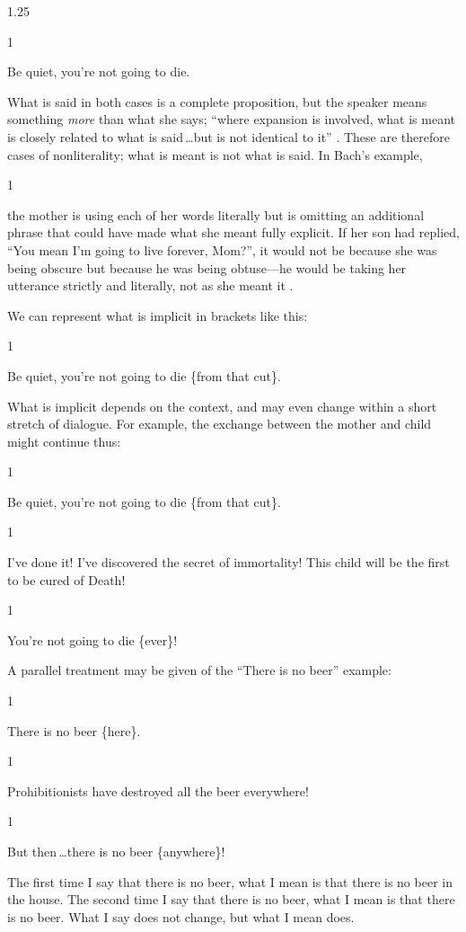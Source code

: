 \documentclass[12pt,twoside]{reedfancy}
\newenvironment{squote}{%
	\begin{spacing}{1}
	\begin{list}{}{%
	\setlength{\labelwidth}{0pt}%
	\rightmargin\leftmargin%
	}
	\item\relax
	}{%
	\end{list}%
	\end{spacing}
	}
\newcommand{\stage}[3]%
{%
	\begin{spacing}{1}%
	\vspace{0pt}
		\begin{description}[style=nextline, parsep=0pt,
                    leftmargin=15mm, itemindent=-10mm, font=\mdseries]
			\item[\textsc{#1} \emph{#2}] #3
		\end{description}%
	\end{spacing}%
}
\begin{document}
\begin{spacing}{1.25}
\stage{Mother}{(treating her child's cut)}{Be quiet, you're not going
to die.}

What is said in both cases is a complete proposition, but the speaker
means something {\em more} than what she says; ``where expansion is
involved, what is meant is closely related to what is said\,\ldots but
is not identical to it'' \citep{bach1994}.  These are therefore cases
of nonliterality; what is meant is not what is said.  In Bach's
example,

\begin{squote}
the mother is using each of her words literally but is omitting an
additional phrase that could have made what she meant fully explicit.
If her son had replied, ``You mean I'm going to live forever, Mom?'',
it would not be because she was being obscure but because he was being
obtuse---he would be taking her utterance strictly and literally, not
as she meant it \citeyearpar{bach1994}.
\end{squote}

We can represent what is implicit in brackets like this:

\stage{Mother}{(treating her child's cut)}{Be quiet, you're not going
to die \{from that cut\}.}

\noindent What is implicit depends on the context, and may even change
within a short stretch of dialogue.  For example, the exchange between
the mother and child might continue thus:

\stage{Mother}{(treating her child's cut)}{Be quiet, you're not going
  to die \{from that cut\}.}

\stage{Scientist}{(runs in)}{I've done it!  I've discovered the secret
  of immortality!  This child will be the first to be cured of Death!}

\stage{Mother}{(to her child)}{You're not going to die \{ever\}!}

A parallel treatment may be given of the ``There is no beer'' example:

\stage{Me}{}{There is no beer \{here\}.}

\stage{Lauren}{(enters)}{Prohibitionists have destroyed all the beer
  everywhere!}

\stage{Me}{(horror-struck)}{But then\,\ldots there is no beer
  \{anywhere\}!}

The first time I say that there is no beer, what I mean is that there
is no beer in the house.  The second time I say that there is no beer,
what I mean is that there is no beer.  What I say does not change, but
what I mean does.


\end{spacing}
\end{document}
